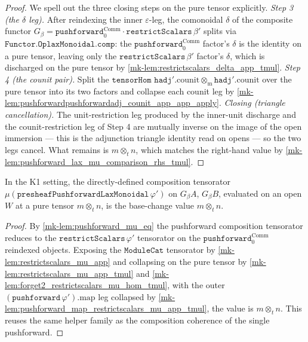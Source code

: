 \begin{proof}
  We spell out the three closing steps on the pure tensor explicitly. \emph{Step 3 (the \(\delta\)
  leg).} After reindexing the inner \(\varepsilon\)-leg, the comonoidal \(\delta\) of the composite
  functor \(G_\beta = \mathtt{pushforward}_0^{\mathrm{Comm}} \cdot \mathtt{restrictScalars}\,\beta'\)
  splits via \(\mathtt{Functor.OplaxMonoidal.comp}\): the \(\mathtt{pushforward}_0^{\mathrm{Comm}}\)
  factor's \(\delta\) is the identity on a pure tensor, leaving only the
  \(\mathtt{restrictScalars}\,\beta'\) factor's \(\delta\), which is discharged on the pure tensor by
  \ref{mk-lem:restrictscalars_delta_app_tmul}. \emph{Step 4 (the counit pair).} Split the
  \(\mathtt{tensorHom}\) \(\mathtt{hadj}'.\mathrm{counit} \otimes_{\mathrm m}
  \mathtt{hadj}'.\mathrm{counit}\) over the pure tensor into its two factors and collapse each counit
  leg by \ref{mk-lem:pushforwardpushforwardadj_counit_app_app_apply}. \emph{Closing (triangle
  cancellation).} The unit-restriction leg produced by the inner-unit discharge and the
  counit-restriction leg of Step 4 are mutually inverse on the image of the open immersion --- this is
  the adjunction triangle identity read on opens --- so the two legs cancel. What remains is
  \(m \otimes_t n\), which matches the right-hand value by
  \ref{mk-lem:pushforward_lax_mu_comparison_rhs_tmul}.
\end{proof}

\begin{lemma}\label{mk-lem:pushforward_lax_mu_comparison_rhs_tmul}
  \leanok

  In the K1 setting, the directly-defined composition tensorator
  \(\mu(\mathtt{presheafPushforwardLaxMonoidal}\,\varphi')\) on \(G_\beta A\), \(G_\beta B\),
  evaluated on an open \(W\) at a pure tensor \(m \otimes_t n\), is the base-change value
  \(m \otimes_t n\).
\end{lemma}
\begin{proof}
  \leanok
  By \ref{mk-lem:pushforward_mu_eq} the pushforward composition tensorator reduces to the
  \(\mathtt{restrictScalars}\,\varphi'\) tensorator on the \(\mathtt{pushforward}_0^{\mathrm{Comm}}\)
  reindexed objects. Exposing the \(\mathtt{ModuleCat}\) tensorator by
  \ref{mk-lem:restrictscalars_mu_app} and collapsing on the pure tensor by
  \ref{mk-lem:restrictscalars_mu_app_tmul} and \ref{mk-lem:forget2_restrictscalars_mu_hom_tmul}, with the
  outer \((\mathtt{pushforward}\,\varphi').\mathrm{map}\) leg collapsed by
  \ref{mk-lem:pushforward_map_restrictscalars_mu_app_tmul}, the value is \(m \otimes_t n\). This reuses
  the same helper family as the composition coherence of the single pushforward.
\end{proof}


